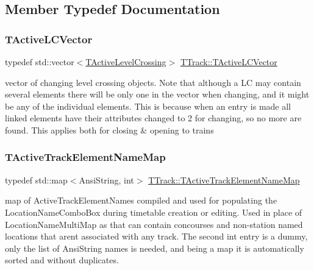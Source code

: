 \subsection{Member Typedef Documentation}
\mbox{\label{class_t_track_af124e944cfb44075f390cf5eceaf3e66}} 
\subsubsection{\texorpdfstring{T\+Active\+L\+C\+Vector}{TActiveLCVector}}
{\footnotesize\ttfamily typedef std\+::vector$<$\mbox{\hyperlink{class_t_track_1_1_t_active_level_crossing}{T\+Active\+Level\+Crossing}}$>$ \mbox{\hyperlink{class_t_track_af124e944cfb44075f390cf5eceaf3e66}{T\+Track\+::\+T\+Active\+L\+C\+Vector}}}

vector of changing level crossing objects. Note that although a LC may contain several elements there will be only one in the vector when changing, and it might be any of the individual elements. This is because when an entry is made all linked elements have their attributes changed to 2 for changing, so no more are found. This applies both for closing \& opening to trains \mbox{\label{class_t_track_af78e1d88c49cebd05b35fc408a5d9d2e}} 
\subsubsection{\texorpdfstring{T\+Active\+Track\+Element\+Name\+Map}{TActiveTrackElementNameMap}}
{\footnotesize\ttfamily typedef std\+::map$<$Ansi\+String, int$>$ \mbox{\hyperlink{class_t_track_af78e1d88c49cebd05b35fc408a5d9d2e}{T\+Track\+::\+T\+Active\+Track\+Element\+Name\+Map}}}

map of Active\+Track\+Element\+Names compiled and used for populating the Location\+Name\+Combo\+Box during timetable creation or editing. Used in place of Location\+Name\+Multi\+Map as that can contain concourses and non-\/station named locations that aren\textquotesingle{}t associated with any track. The second \textquotesingle{}int\textquotesingle{} entry is a dummy, only the list of Ansi\+String names is needed, and being a map it is automatically sorted and without duplicates. \mbox{\label{class_t_track_a1ac6dda244b2f5a6e27a458f28fc1b1c}} 
